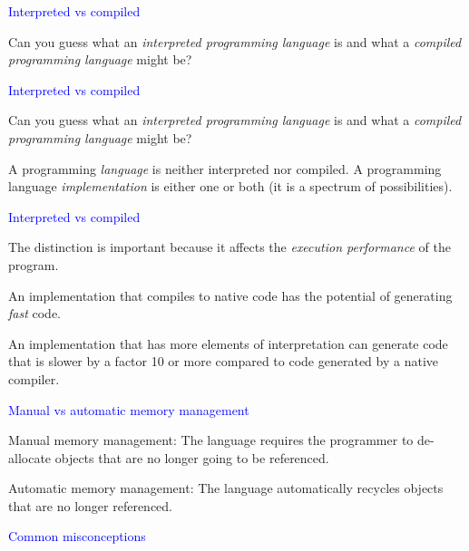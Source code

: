 \documentclass{slides}
\newcommand{\ti}[1]{\begin{center}\Large{\textcolor{blue}{#1}}\end{center}}
\begin{document}
\begin{slide}\ti{Interpreted vs compiled}

Can you guess what an \emph{interpreted programming language} is and
what a \emph{compiled programming language} might be?

\vfill\end{slide}
\begin{slide}\ti{Interpreted vs compiled}

Can you guess what an \emph{interpreted programming language} is and
what a \emph{compiled programming language} might be?

A programming \emph{language} is neither interpreted nor compiled.  A
programming language \emph{implementation} is either one or both (it
is a spectrum of possibilities).

\vfill\end{slide}
\begin{slide}\ti{Interpreted vs compiled}

The distinction is important because it affects the \emph{execution
  performance} of the program.

An implementation that compiles to native code has the potential of
generating \emph{fast} code.

An implementation that has more elements of interpretation can
generate code that is slower by a factor 10 or more compared to code
generated by a native compiler.

\vfill\end{slide}
\begin{slide}\ti{Manual vs automatic memory management}

Manual memory management: The language requires the programmer to
de-allocate objects that are no longer going to be referenced.

Automatic memory management: The language automatically recycles
objects that are no longer referenced.

\vfill\end{slide}
\begin{slide}\ti{Common misconceptions}

\vfill\end{slide}
\end{document}
